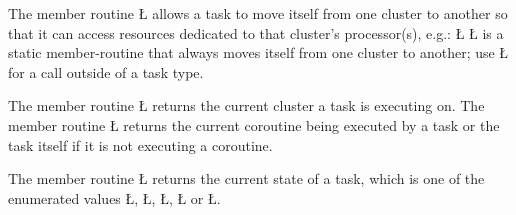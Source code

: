 \documentclass[openright,twoside]{report}
\begin{document}
The member routine \LGinlinetrue\LGbegin\lgrinde\L{}\endlgrinde\LGend{} allows a task to move itself from one cluster to another so that it can access resources dedicated to that cluster's processor(s), e.g.:
\LGinlinefalse\LGbegin\lgrinde
\L{}
\endlgrinde\LGend
\LGinlinetrue\LGbegin\lgrinde\L{}\endlgrinde\LGend{} is a static member-routine that always moves itself from one cluster to another;
use \LGinlinetrue\LGbegin\lgrinde\L{}\endlgrinde\LGend{} for a call outside of a task type.

The member routine \LGinlinetrue\LGbegin\lgrinde\L{}\endlgrinde\LGend{} returns the current cluster a task is executing on.
The member routine \LGinlinetrue\LGbegin\lgrinde\L{}\endlgrinde\LGend{} returns the current coroutine being executed by a task or the task itself if it is not executing a coroutine.

\begin{sloppypar}
The member routine \LGinlinetrue\LGbegin\lgrinde\L{}\endlgrinde\LGend{} returns the current state of a task, which is one of the enumerated values \LGinlinetrue\LGbegin\lgrinde\L{}\endlgrinde\LGend{}, \LGinlinetrue\LGbegin\lgrinde\L{}\endlgrinde\LGend{}, \LGinlinetrue\LGbegin\lgrinde\L{}\endlgrinde\LGend{}, \LGinlinetrue\LGbegin\lgrinde\L{}\endlgrinde\LGend{} or \LGinlinetrue\LGbegin\lgrinde\L{}\endlgrinde\LGend{}.
\end{sloppypar}
\end{document}
